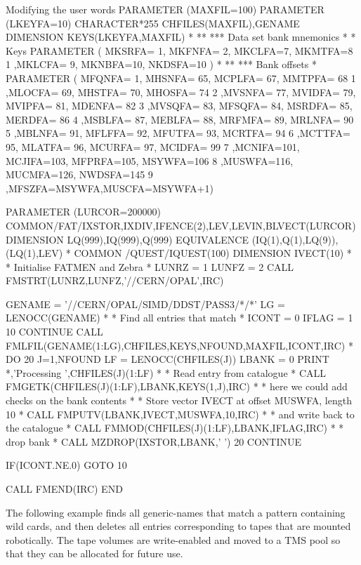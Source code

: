 \begin{XMPt}{Modifying the user words}
      PARAMETER     (MAXFIL=100)
      PARAMETER     (LKEYFA=10)
      CHARACTER*255 CHFILES(MAXFIL),GENAME
      DIMENSION     KEYS(LKEYFA,MAXFIL)
*
** ***     Data set bank mnemonics
*
*          Keys
      PARAMETER ( MKSRFA= 1, MKFNFA= 2, MKCLFA=7, MKMTFA=8
     1           ,MKLCFA= 9, MKNBFA=10, NKDSFA=10 )
*
** ***     Bank offsets
*
      PARAMETER ( MFQNFA=  1, MHSNFA= 65, MCPLFA= 67, MMTPFA= 68
     1           ,MLOCFA= 69, MHSTFA= 70, MHOSFA= 74
     2           ,MVSNFA= 77, MVIDFA= 79, MVIPFA= 81, MDENFA= 82
     3           ,MVSQFA= 83, MFSQFA= 84, MSRDFA= 85, MERDFA= 86
     4           ,MSBLFA= 87, MEBLFA= 88, MRFMFA= 89, MRLNFA= 90
     5           ,MBLNFA= 91, MFLFFA= 92, MFUTFA= 93, MCRTFA= 94
     6           ,MCTTFA= 95, MLATFA= 96, MCURFA= 97, MCIDFA= 99
     7           ,MCNIFA=101, MCJIFA=103, MFPRFA=105, MSYWFA=106
     8           ,MUSWFA=116, MUCMFA=126, NWDSFA=145
     9           ,MFSZFA=MSYWFA,MUSCFA=MSYWFA+1)

      PARAMETER (LURCOR=200000)
      COMMON/FAT/IXSTOR,IXDIV,IFENCE(2),LEV,LEVIN,BLVECT(LURCOR)
      DIMENSION    LQ(999),IQ(999),Q(999)
      EQUIVALENCE (IQ(1),Q(1),LQ(9)),(LQ(1),LEV)
*
      COMMON /QUEST/IQUEST(100)
      DIMENSION     IVECT(10)
*
*     Initialise FATMEN and Zebra
*
      LUNRZ = 1
      LUNFZ = 2
      CALL FMSTRT(LUNRZ,LUNFZ,'//CERN/OPAL',IRC)
 
      GENAME = '//CERN/OPAL/SIMD/DDST/PASS3/*/*'
      LG = LENOCC(GENAME)
*
*     Find all entries that match 
*
      ICONT = 0
      IFLAG = 1
10    CONTINUE
      CALL FMLFIL(GENAME(1:LG),CHFILES,KEYS,NFOUND,MAXFIL,ICONT,IRC)
*
      DO 20 J=1,NFOUND
      LF = LENOCC(CHFILES(J))
      LBANK = 0
      PRINT *,'Processing ',CHFILES(J)(1:LF)
*
*     Read entry from catalogue
*
      CALL FMGETK(CHFILES(J)(1:LF),LBANK,KEYS(1,J),IRC) 
*
*     here we could add checks on the bank contents
*
*     Store vector IVECT at offset MUSWFA, length 10
*
      CALL FMPUTV(LBANK,IVECT,MUSWFA,10,IRC)
*
*     and write back to the catalogue
*
      CALL FMMOD(CHFILES(J)(1:LF),LBANK,IFLAG,IRC)
*
*     drop bank
*
      CALL MZDROP(IXSTOR,LBANK,' ')
20    CONTINUE

      IF(ICONT.NE.0) GOTO 10

      CALL FMEND(IRC)
      END
\end{XMPt}

The following example finds all generic-names that match
a pattern containing wild cards, and then deletes all 
entries corresponding to tapes that are mounted robotically.
The tape volumes are write-enabled and moved to a TMS pool
so that they can be allocated for future use.

